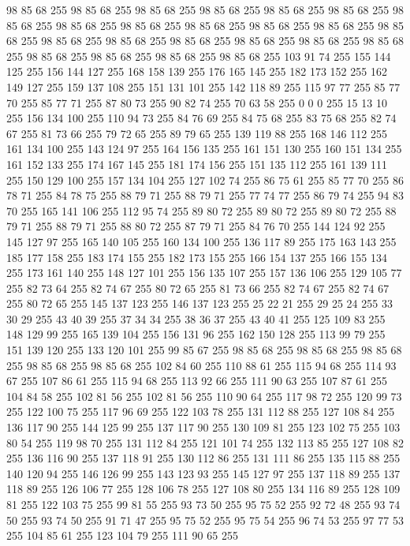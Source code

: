 98 85 68 255 98 85 68 255 98 85 68 255 98 85 68 255 98 85 68 255 98 85 68 255 98 85 68 255 98 85 68 255 98 85 68 255 98 85 68 255 98 85 68 255 98 85 68 255 98 85 68 255 98 85 68 255 98 85 68 255 98 85 68 255 98 85 68 255 98 85 68 255 98 85 68 255 98 85 68 255 98 85 68 255 98 85 68 255 98 85 68 255 103 91 74 255 155 144 125 255 156 144 127 255 168 158 139 255 176 165 145 255 182 173 152 255 162 149 127 255 159 137 108 255 151 131 101 255 142 118 89 255 115 97 77 255 85 77 70 255 85 77 71 255 87 80 73 255 90 82 74 255 70 63 58 255 0 0 0 255 15 13 10 255 156 134 100 255 110 94 73 255 84 76 69 255 84 75 68 255 83 75 68 255 82 74 67 255 81 73 66 255 79 72 65 255 89 79 65 255 139 119 88 255 168 146 112 255 161 134 100 255 143 124 97 255 164 156 135 255 161 151 130 255 160 151 134 255 161 152 133 255 174 167 145 255 181 174 156 255 151 135 112 255 161 139 111 255 150 129 100 255 157 134 104 255
127 102 74 255 86 75 61 255 85 77 70 255 86 78 71 255 84 78 75 255 88 79 71 255 88 79 71 255 77 74 77 255 86 79 74 255 94 83 70 255 165 141 106 255 112 95 74 255 89 80 72 255 89 80 72 255 89 80 72 255 88 79 71 255 88 79 71 255 88 80 72 255 87 79 71 255 84 76 70 255 144 124 92 255 145 127 97 255 165 140 105 255 160 134 100 255 136 117 89 255 175 163 143 255 185 177 158 255 183 174 155 255 182 173 155 255 166 154 137 255 166 155 134 255 173 161 140 255 148 127 101 255 156 135 107 255 157 136 106 255 129 105 77 255 82 73 64 255 82 74 67 255 80 72 65 255 81 73 66 255 82 74 67 255 82 74 67 255 80 72 65 255 145 137 123 255 146 137 123 255 25 22 21 255 29 25 24 255 33 30 29 255 43 40 39 255 37 34 34 255 38 36 37 255 43 40 41 255 125 109 83 255 148 129 99 255 165 139 104 255 156 131 96 255 162 150 128 255 113 99 79 255 151 139 120 255 133 120 101 255 99 85 67 255 98 85 68 255 98 85 68 255 98 85 68 255
98 85 68 255 98 85 68 255 102 84 60 255 110 88 61 255 115 94 68 255 114 93 67 255 107 86 61 255 115 94 68 255 113 92 66 255 111 90 63 255 107 87 61 255 104 84 58 255 102 81 56 255 102 81 56 255 110 90 64 255 117 98 72 255 120 99 73 255 122 100 75 255 117 96 69 255 122 103 78 255 131 112 88 255 127 108 84 255 136 117 90 255 144 125 99 255 137 117 90 255 130 109 81 255 123 102 75 255 103 80 54 255 119 98 70 255 131 112 84 255 121 101 74 255 132 113 85 255 127 108 82 255 136 116 90 255 137 118 91 255 130 112 86 255 131 111 86 255 135 115 88 255 140 120 94 255 146 126 99 255 143 123 93 255 145 127 97 255 137 118 89 255 137 118 89 255 126 106 77 255 128 106 78 255 127 108 80 255 134 116 89 255 128 109 81 255 122 103 75 255 99 81 55 255 93 73 50 255 95 75 52 255 92 72 48 255 93 74 50 255 93 74 50 255 91 71 47 255 95 75 52 255 95 75 54 255 96 74 53 255 97 77 53 255 104 85 61 255 123 104 79 255 111 90 65 255
